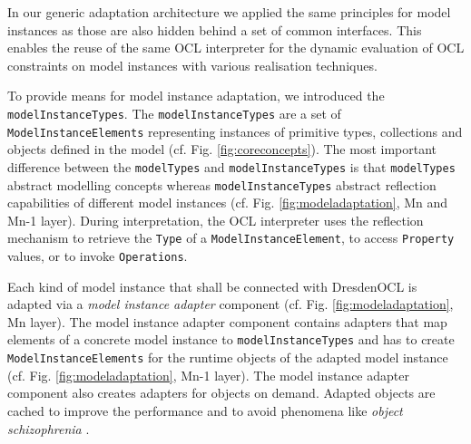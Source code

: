	In our generic adaptation architecture we applied the same principles for model instances as those are also hidden behind a set of common
	interfaces. This enables the reuse of the same OCL interpreter for the dynamic
	evaluation of OCL constraints on model instances with various realisation techniques.
	
	To provide means for model instance adaptation, we introduced the
	\texttt{model\-Instance\-Types}. The \texttt{modelInstanceTypes} are a set of \texttt{ModelInstanceElements}
	representing instances of primitive types, 
	collections and objects defined in the model (cf. Fig. \ref{fig:coreconcepts}). 
  The most important difference between the \texttt{modelTypes} and \texttt{modelInstanceTypes}
	is that \texttt{modelTypes} abstract modelling concepts whereas \texttt{modelInstanceTypes} abstract 
	reflection capabilities of different model instances (cf. Fig. \ref{fig:modeladaptation}, Mn and Mn-1 layer).
	During interpretation, the OCL interpreter uses the reflection mechanism to
	retrieve the \texttt{Type} of a \texttt{ModelInstanceElement}, to access \texttt{Property}
	values, or to invoke \texttt{Operations}.
	
	Each kind of model instance that shall be connected with DresdenOCL is
	adapted via a \emph{model instance adapter} component (cf. Fig.
	\ref{fig:modeladaptation}, Mn layer). The model instance adapter component contains adapters that map elements of a
	concrete model instance to \texttt{modelInstanceTypes} and has to
	create \texttt{Model\-Instance\-Elements} for the runtime 
	objects of the adapted model instance (cf. Fig. \ref{fig:modeladaptation}, Mn-1 layer). 
	The model instance adapter component also 
	creates adapters for objects on demand. Adapted objects are cached to
	improve the performance and to avoid phenomena like \emph{object
	schizophrenia} \cite{assmann:isc}.
	


